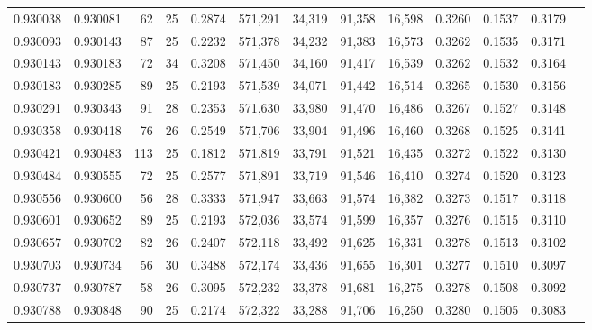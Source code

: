 \begin{tabular}{rrrrrrrrrrrrr}
0.930038 & 0.930081 &    62 &  25 &                                     0.2874 & 571,291 &  34,319 &  91,358 &  16,598 & 0.3260 & 0.1537 & 0.3179 \\
0.930093 & 0.930143 &    87 &  25 &                                     0.2232 & 571,378 &  34,232 &  91,383 &  16,573 & 0.3262 & 0.1535 & 0.3171 \\
0.930143 & 0.930183 &    72 &  34 &                                     0.3208 & 571,450 &  34,160 &  91,417 &  16,539 & 0.3262 & 0.1532 & 0.3164 \\
0.930183 & 0.930285 &    89 &  25 &                                     0.2193 & 571,539 &  34,071 &  91,442 &  16,514 & 0.3265 & 0.1530 & 0.3156 \\
0.930291 & 0.930343 &    91 &  28 &                                     0.2353 & 571,630 &  33,980 &  91,470 &  16,486 & 0.3267 & 0.1527 & 0.3148 \\
0.930358 & 0.930418 &    76 &  26 &                                     0.2549 & 571,706 &  33,904 &  91,496 &  16,460 & 0.3268 & 0.1525 & 0.3141 \\
0.930421 & 0.930483 &   113 &  25 &                                     0.1812 & 571,819 &  33,791 &  91,521 &  16,435 & 0.3272 & 0.1522 & 0.3130 \\
0.930484 & 0.930555 &    72 &  25 &                                     0.2577 & 571,891 &  33,719 &  91,546 &  16,410 & 0.3274 & 0.1520 & 0.3123 \\
0.930556 & 0.930600 &    56 &  28 &                                     0.3333 & 571,947 &  33,663 &  91,574 &  16,382 & 0.3273 & 0.1517 & 0.3118 \\
0.930601 & 0.930652 &    89 &  25 &                                     0.2193 & 572,036 &  33,574 &  91,599 &  16,357 & 0.3276 & 0.1515 & 0.3110 \\
0.930657 & 0.930702 &    82 &  26 &                                     0.2407 & 572,118 &  33,492 &  91,625 &  16,331 & 0.3278 & 0.1513 & 0.3102 \\
0.930703 & 0.930734 &    56 &  30 &                                     0.3488 & 572,174 &  33,436 &  91,655 &  16,301 & 0.3277 & 0.1510 & 0.3097 \\
0.930737 & 0.930787 &    58 &  26 &                                     0.3095 & 572,232 &  33,378 &  91,681 &  16,275 & 0.3278 & 0.1508 & 0.3092 \\
0.930788 & 0.930848 &    90 &  25 &                                     0.2174 & 572,322 &  33,288 &  91,706 &  16,250 & 0.3280 & 0.1505 & 0.3083 \\

\end{tabular}
